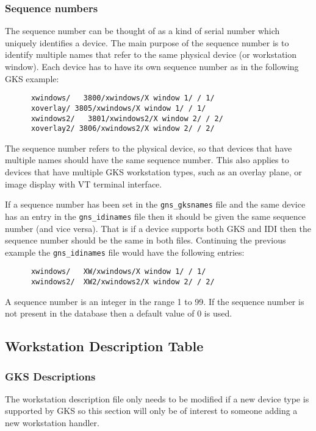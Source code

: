 \subsubsection{\label{seqno}Sequence numbers}

The sequence number can be thought of as a kind of serial number which
uniquely identifies a device. The main purpose of the sequence number
is to identify multiple names that refer to the same
physical device (or workstation window). 
Each device has to have its own sequence
number as in the following GKS example:
\begin{verbatim}
      xwindows/   3800/xwindows/X window 1/ / 1/
      xoverlay/ 3805/xwindows/X window 1/ / 1/ 
      xwindows2/   3801/xwindows2/X window 2/ / 2/
      xoverlay2/ 3806/xwindows2/X window 2/ / 2/
\end{verbatim}
The sequence number refers to the physical device, so that devices that
have multiple names should have the same sequence number. This also
applies to devices that have multiple GKS workstation types, such as an
overlay plane, or image display with VT terminal interface.

If a sequence number has been set in the {\tt gns\_gksnames} file and the same
device has an entry in the {\tt gns\_idinames} file then it should be given
the same sequence number (and vice versa). That is if a device supports
both GKS and IDI then the sequence number should be the same in both files.
Continuing the previous example the {\tt gns\_idinames} file would have
the following entries:
\begin{verbatim}
      xwindows/   XW/xwindows/X window 1/ / 1/
      xwindows2/  XW2/xwindows2/X window 2/ / 2/
\end{verbatim}

A sequence number is an integer in the range 1 to 99. If the sequence number
is not present in the database then a default value of 0 is used.

\subsection{Workstation Description Table}\label{wdt}

\subsubsection{GKS Descriptions}

The workstation description file only needs to be modified if a new device type
is supported by GKS so this section will only be of interest to someone adding
a new workstation handler.

